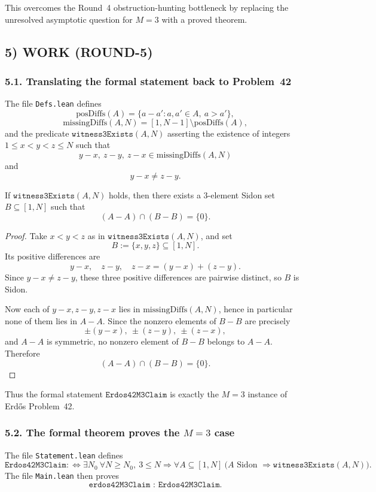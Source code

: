 This overcomes the Round~4 obstruction-hunting bottleneck by replacing the unresolved asymptotic question for \(M=3\) with a proved theorem.

\subsection{5) WORK (ROUND-5)}

\subsubsection*{5.1. Translating the formal statement back to Problem~42}
The file \texttt{Defs.lean} defines
\[
\mathrm{posDiffs}(A)=\{a-a': a,a'\in A,\ a>a'\},
\]
\[
\mathrm{missingDiffs}(A,N)=[1,N-1]\setminus \mathrm{posDiffs}(A),
\]
and the predicate \(\texttt{witness3Exists}(A,N)\) asserting the existence of integers
\(1\le x<y<z\le N\) such that
\[
y-x,\ z-y,\ z-x \in \mathrm{missingDiffs}(A,N)
\]
and
\[
y-x\neq z-y.
\]

\begin{lemma}\label{lem:witness-to-B}
If \(\texttt{witness3Exists}(A,N)\) holds, then there exists a 3-element Sidon set \(B\subseteq[1,N]\) such that
\[
(A-A)\cap(B-B)=\{0\}.
\]
\end{lemma}

\begin{proof}
Take \(x<y<z\) as in \(\texttt{witness3Exists}(A,N)\), and set
\[
B:=\{x,y,z\}\subseteq[1,N].
\]
Its positive differences are
\[
y-x,\quad z-y,\quad z-x=(y-x)+(z-y).
\]
Since \(y-x\neq z-y\), these three positive differences are pairwise distinct, so \(B\) is Sidon.

Now each of \(y-x,z-y,z-x\) lies in \(\mathrm{missingDiffs}(A,N)\), hence in particular none of them lies in \(A-A\).  Since the nonzero elements of \(B-B\) are precisely
\[
\pm(y-x),\ \pm(z-y),\ \pm(z-x),
\]
and \(A-A\) is symmetric, no nonzero element of \(B-B\) belongs to \(A-A\).  Therefore
\[
(A-A)\cap(B-B)=\{0\}.
\]
\end{proof}

Thus the formal statement \(\texttt{Erdos42M3Claim}\) is exactly the \(M=3\) instance of Erd\H{o}s Problem~42.

\subsubsection*{5.2. The formal theorem proves the \(M=3\) case}
The file \texttt{Statement.lean} defines
\[
\texttt{Erdos42M3Claim}:\iff \exists N_0\ \forall N\ge N_0,\ 3\le N \Rightarrow
\forall A\subseteq[1,N]\ \bigl(A \text{ Sidon } \Rightarrow \texttt{witness3Exists}(A,N)\bigr).
\]
The file \texttt{Main.lean} then proves
\[
\texttt{erdos42M3Claim : Erdos42M3Claim}.
\]

